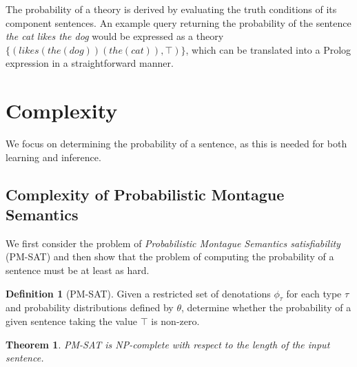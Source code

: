 \documentclass[a4paper,11pt]{article}
\newtheorem*{theorem}{Theorem}
\theoremstyle{definition}
\newtheorem*{definition}{Definition}
\newcommand{\hide}[1]{}
\begin{document}
The probability of a theory is derived by evaluating the truth
conditions of its component sentences.
An example query returning the
probability of the sentence {\em the cat likes the dog\/} would be
expressed as a theory
$\{(\mathit{likes}(\mathit{the}(\mathit{dog}))(\mathit{the}(\mathit{cat})),\top)\}$,
which can be translated into a Prolog expression in a straightforward
manner.


\section{Complexity}

We focus on determining the probability of a sentence,
as this is needed for both learning and inference.

\subsection{Complexity of Probabilistic Montague Semantics}

We first consider the problem of {\em Probabilistic Montague Semantics satisfiability\/} (PM-SAT) and then show that the problem of computing the probability of a sentence must be at least as hard.

\begin{definition}[PM-SAT]

  Given 
  a restricted set of
  denotations $\phi_\tau$ for each type $\tau$ and probability
  distributions defined by $\theta$, determine whether the probability
  of a given sentence taking the value $\top$ is non-zero.
\end{definition}

\begin{theorem}
  \emph{PM-SAT} is NP-complete with respect to the length of the input
  sentence.
\end{theorem}
\end{document}
